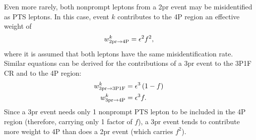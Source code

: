 Even more rarely, both nonprompt leptons from a 2pr event may be misidentified as PTS leptons.
In this case, event $k$ contributes to the 4P region an effective weight of
\begin{equation}
	\label{eqn:wt_2prto4p}
	w_{\text{2pr} \to \text{4P}}^k = \epsilon^2 f^2,
\end{equation}
where it is assumed that both leptons have the same misidentification rate.
Similar equations can be derived for the contributions of a 3pr event to the 3P1F CR and to the 4P region:
\begin{align}
	\label{eqn:wt_3prto3p1f}
	w_{\text{3pr} \to \text{3P1F}}^k &= \epsilon^3 \left( 1-f \right)
	\\
	\label{eqn:wt_3prto4p}
	w_{\text{3pr} \to \text{4P}}^k &= \epsilon^3 f.
\end{align}
Since a 3pr event needs only 1 nonprompt PTS lepton to be included in the 4P region (therefore, carrying only 1 factor of $f$), a 3pr event tends to contribute more weight to 4P than does a 2pr event (which carries $f^2$).


